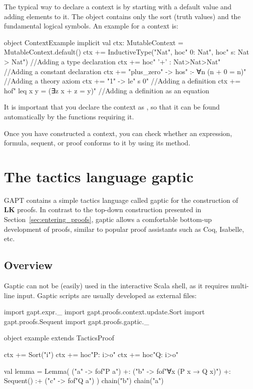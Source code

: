 \documentclass[a4paper,11pt]{book}
\newcommand{\LK}{\textbf{LK}}
\newcommand{\cli}[1]{{\ttfamily {#1}}}
\begin{document}
The typical way to declare a context is by starting with a default value and adding elements to it.
The \cli{Context.default} object contains only the sort \cli{o} (truth values) and the fundamental logical
symbols. An example for a context is:
\begin{tacticslisting}[bare]
  object ContextExample {
      implicit val ctx: MutableContext = MutableContext.default()
      ctx += InductiveType("Nat", hoc" 0: Nat", hoc" s: Nat > Nat") //Adding a type declaration
      ctx += hoc" '+' : Nat>Nat>Nat" //Adding a constant declaration
      ctx += "plus_zero" -> hos" :- ∀n (n + 0 = n)" //Adding a theory axiom
      ctx += "1" -> le" s 0" //Adding a definition
      ctx += hof" leq x y = (∃z x + z = y)" //Adding a definition as an equation
    }
\end{tacticslisting}
\begin{tacticsoutput}

\end{tacticsoutput}

It is important that you declare the context as \cli{implicit}, so that it can be found automatically
by the functions requiring it.

Once you have constructed a context, you can check whether an expression, formula, sequent, or proof conforms to it by using its \cli{check} method.

\section{The tactics language gaptic}\label{sec:gaptic}

GAPT contains a simple tactics language called gaptic for the construction of {\LK} proofs.
In contrast to the top-down construction presented in Section~\ref{sec:entering_proofs},
gaptic allows a comfortable bottom-up development of proofs, similar
to popular proof assistants such as Coq, Isabelle, etc.

\subsection{Overview}

Gaptic can not be (easily) used in the interactive Scala shell, as it requires
multi-line input.  Gaptic scripts are usually developed as external files:
\begin{tacticslisting}
  import gapt.expr._
  import gapt.proofs.context.update.Sort
  import gapt.proofs.Sequent
  import gapt.proofs.gaptic._

  object example extends TacticsProof {
      ctx += Sort("i")
      ctx += hoc"P: i>o"
      ctx += hoc"Q: i>o"

      val lemma = Lemma(
      ("a" -> fof"P a") +:
      ("b" -> fof"∀x (P x → Q x)") +:
      Sequent()
      :+ ("c" -> fof"Q a")
      ) {
          chain("b")
          chain("a")
        }
    }
\end{tacticslisting}
\begin{tacticsoutput}

\end{tacticsoutput}
\end{document}
